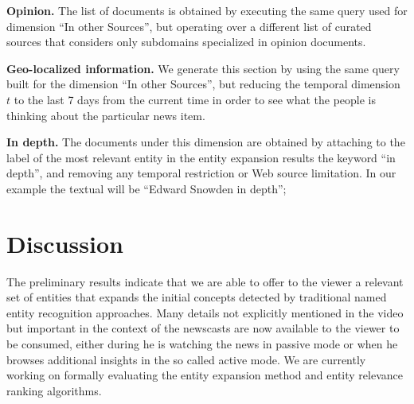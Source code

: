 \documentclass{llncs}
\begin{document}
\textbf{Opinion.} The list of documents is obtained by executing the same query used for dimension ``In other Sources'', but operating over a different list of curated sources that considers only subdomains specialized in opinion documents.

\textbf{Geo-localized information.} We generate this section by using the same query built for the dimension ``In other Sources'', but reducing the temporal dimension $t$ to the last 7 days from the current time in order to see what the people is thinking about the particular news item.

\textbf{In depth.} The documents under this dimension are obtained by attaching to the label of the most relevant entity in the entity expansion results the keyword ``in depth'', and removing any temporal restriction or Web source limitation. In our example the textual will be ``Edward Snowden in depth'';
		

\section{Discussion}
\label{sec:discussion}
The preliminary results indicate that we are able to offer to the viewer a relevant set of entities that expands the initial concepts detected by traditional named entity recognition approaches. Many details not explicitly mentioned in the video but important in the context of the newscasts are now available to the viewer to be consumed, either during he is watching the news in passive mode or when he browses additional insights in the so called active mode. We are currently working on formally evaluating the entity expansion method and entity relevance ranking algorithms.


\end{document}
